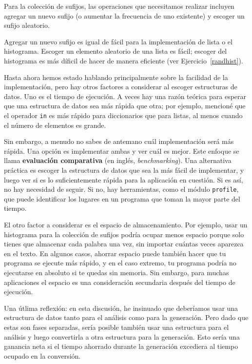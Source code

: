 \documentclass[10pt]{book}
\begin{document}
Para la colección de sufijos, las operaciones que necesitamos
realizar incluyen agregar un nuevo sufijo (o aumentar la frecuencia
de uno existente) y escoger un sufijo aleatorio.

Agregar un nuevo sufijo es igual de fácil para la implementación de lista
o el histograma.  Escoger un elemento aleatorio de una lista
es fácil; escoger del histograma es más díficil de hacer 
de manera eficiente (ver Ejercicio~\ref{randhist}).

Hasta ahora hemos estado hablando principalmente sobre la facilidad de la implementación,
pero hay otros factores a considerar al escoger estructuras de datos.
Uno es el tiempo de ejecución.  A veces hay una razón teórica para esperar
que una estructura de datos sea más rápida que otra; por ejemplo, mencioné
que el operador {\tt in} es más rápido para diccionarios que para listas,
al menos cuando el número de elementos es grande.

Sin embargo, a menudo no sabes de antemano cuál implementación
será más rápida.  Una opción es implementar ambas y ver cuál
es mejor.  Este enfoque se llama {\bf evaluación comparativa} (en inglés, {\em benchmarking}).
Una alternativa práctica es escoger la estructura de datos que sea
la más fácil de implementar, y luego ver si es lo suficientemente rápida para
la aplicación en cuestión.  Si es así, no hay necesidad de seguir.  Si no,
hay herramientas, como el módulo {\tt profile}, que puede identificar
los lugares en un programa que toman la mayor parte del tiempo.

El otro factor a considerar es el espacio de almacenamiento.  Por ejemplo, usar un
histograma para la colección de sufijos podría ocupar menos espacio porque
solo tienes que almacenar cada palabra una vez, sin importar cuántas veces
aparezca en el texto.  En algunos casos, ahorrar espacio puede también hacer que tu
programa se ejecute más rápido, y en el caso extremo, tu programa podría no ejecutarse
en absoluto si te quedas sin memoria.  Sin embargo, para muchas aplicaciones el espacio es
una consideración secundaria después del tiempo de ejecución.

Una útlima reflexión: en esta discusión, he insinuado que
deberíamos usar una estructura de datos tanto para el análisis como para la generación.
Pero dado que estas son fases separadas, sería posible también usar una
estructura para el análisis y luego convertirla a otra estructura para
la generación.  Esto sería una ganancia neta si el tiempo ahorrado durante
la generación excediera al tiempo ocupado en la conversión.
\end{document}
